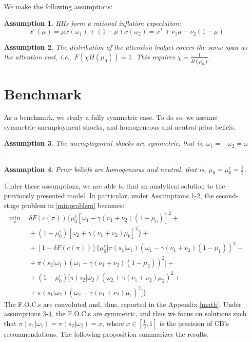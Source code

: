 \documentclass[12pt,a4paper]{article}
\newtheorem{assumption}{Assumption}
\begin{document}
We make the following assumptions:
\begin{assumption}
    \label{Ass1}
    HHs form a rational inflation expectation:
    \begin{equation}
    \label{expectedinflation}
    x^e(\mu)=\mu x(\omega_1)+(1-\mu)x(\omega_2)=x^T+\nu_1\mu-\nu_2(1-\mu)
    \end{equation}
\end{assumption}
\begin{assumption}
\label{Ass2} 
    The distribution of the attention budget covers the same span as the attention cost, i.e., $F(\chi H(\mu_0))=1$. This requires $\chi=\frac{1}{H(\mu_0)}$.
\end{assumption}


\section{Benchmark}

As a benchmark, we study a fully symmetric case. To do so, we assume symmetric unemployment shocks, and homogeneous and neutral prior beliefs. 
\begin{assumption}
\label{Ass3}
    The unemployment shocks are symmetric, that is, $\omega_1=-\omega_2=\omega$.
\end{assumption}
\begin{assumption}
\label{Ass4}
    Prior beliefs are homogeneous and neutral, that is, $\mu_0=\mu_0^c=\frac{1}{2}$.
\end{assumption}
Under these assumptions, we are able to find an analytical solution to the previously presented model.
In particular, under Assumptions \ref{Ass1}-\ref{Ass2}, the second-stage problem in \eqref{minproblem} becomes:
\begin{equation}
\begin{split}
    \min_{\pi} \ & \ \delta F(c(\pi))\Bigg\{\mu_0^c\left[\omega_1-\gamma(\nu_1+\nu_2)(1-\mu_0)\right]^2+\\
    \ & \ +(1-\mu_0^c)\left[\omega_2+\gamma(\nu_1+\nu_2)\mu_0\right]^2\Bigg\}+\\
    \ & \ +[1-\delta F(c(\pi))]\Bigg\{\mu_0^c\bigg[\pi(s_1|\omega_1)(\omega_1-\gamma (\nu_1+\nu_2) (1-\mu_1))^2+\\
    \ & \ +\pi(s_2|\omega_1)(\omega_1-\gamma (\nu_1+\nu_2) (1-\mu_2))^2\bigg]+ \\
    \ & \ +(1-\mu_0^c)\bigg[\pi(s_2|\omega_2)(\omega_2+\gamma (\nu_1+\nu_2) \mu_2)^2+\\
    \ & \ +\pi(s_1|\omega_2)(\omega_2+\gamma (\nu_1+\nu_2) \mu_1)^2 \bigg]\Bigg\}
    \end{split}
\end{equation}
The F.O.C.s are convoluted and, thus, reported in the Appendix \ref{math}.
Under assumptions \ref{Ass3}-\ref{Ass4}, the F.O.C.s are symmetric, and thus we focus on solutions such that $\pi(s_1|\omega_1)=\pi(s_2|\omega_2)=x$, where $x\in\left[\frac{1}{2},1\right]$ is the precision of CB's recommendations. The following proposition summarizes the results.
\end{document}
